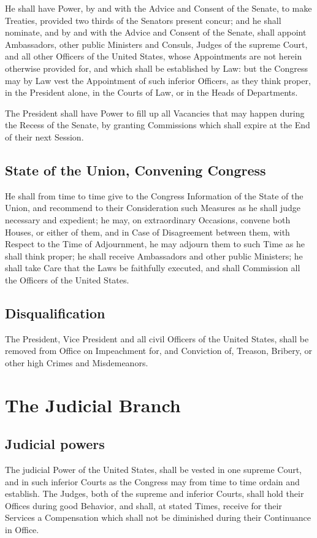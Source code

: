\documentclass{constitution}
\begin{document}
He shall have Power, by and with the Advice and Consent of the Senate, to make Treaties,
provided two thirds of the Senators present concur;
and he shall nominate,
and by and with the Advice and Consent of the Senate,
shall appoint Ambassadors,
	other public Ministers and Consuls,
	Judges of the supreme Court,
and	all other Officers of the United States,
whose Appointments are not herein otherwise provided for,
and which shall be established by Law:
but the Congress may by Law vest the Appointment of such inferior Officers,
as they think proper,
in the President alone,
	in the Courts of Law,
or	in the Heads of Departments.

The President shall have Power to fill up
all Vacancies that may happen during the Recess of the Senate,
by granting Commissions which shall expire at the End of their next Session.

\section{State of the Union, Convening Congress}
He shall from time to time give to the Congress Information of the State of the Union,
and recommend to their Consideration
such Measures as he shall judge necessary and expedient;
he may, on extraordinary Occasions, convene both Houses, or either of them,
and in Case of Disagreement between them, with Respect to the Time of Adjournment,
he may adjourn them to such Time as he shall think proper;
he shall receive Ambassadors and other public Ministers;
he shall take Care that the Laws be faithfully executed,
and shall Commission all the Officers of the United States.

\section{Disqualification}
The President, Vice President and all civil Officers of the United States,
shall be removed from Office on Impeachment for, and Conviction of,
Treason, Bribery, or other high Crimes and Misdemeanors.

\chapter{The Judicial Branch}
\section{Judicial powers}
The judicial Power of the United States,
shall be vested in one supreme Court,
and in such inferior Courts as the Congress may from time to time ordain and establish.
The Judges, both of the supreme and inferior Courts,
shall hold their Offices during good Behavior,
and shall, at stated Times, receive for their Services a Compensation
which shall not be diminished during their Continuance in Office.
\end{document}
